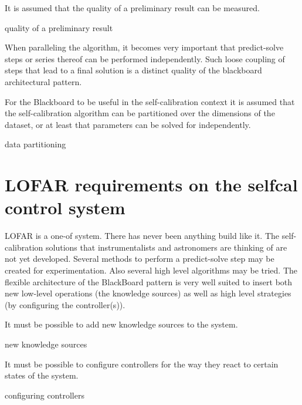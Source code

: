 \documentclass[]{lofar}
\begin{document}
    \begin{assumption}
      It is assumed that the quality of a preliminary result can be
      measured.
      \caption{ quality of a preliminary result\label{ass:quality}}
    \end{assumption}

    When paralleling the algorithm, it becomes very important that
    predict-solve steps or series thereof can be performed
    independently. Such loose coupling of steps that lead to a final
    solution is a distinct quality of the blackboard architectural
    pattern.

    \begin{assumption}
      For the Blackboard to be useful in the self-calibration context
      it is assumed that the self-calibration algorithm can be
      partitioned over the dimensions of the dataset, or at least that
      parameters can be solved for independently.
      \caption{data partitioning\label{ass:partitionable}}
    \end{assumption}

  \section{LOFAR requirements on the selfcal control system}
  \label{sec:LOFAR-requirements}\hypertarget{sec:LOFAR-requirements}{}

    LOFAR is a one-of system. There has never been anything build like
    it. The self-calibration solutions that instrumentalists and
    astronomers are thinking of are not yet developed. Several methods
    to perform a predict-solve step may be created for
    experimentation. Also several high level algorithms may be
    tried. The flexible architecture of the BlackBoard pattern is very
    well suited to insert both new low-level operations (the knowledge
    sources) as well as high level strategies (by configuring the
    controller(s)).

    \begin{requirement}
      It must be possible to add new knowledge sources to the system.
      \caption{new knowledge sources\label{req:knowledge-sources}}
    \end{requirement}

    \begin{requirement}
      It must be possible to configure controllers for the way they
      react to certain states of the system.
      \caption{configuring controllers\label{req:configure-controllers}}
    \end{requirement}
\end{document}
